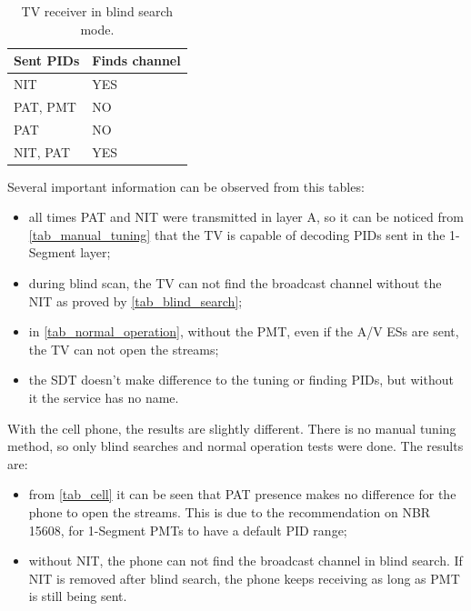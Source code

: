 \documentclass[
	12pt,				%
	openright,			%
	twoside,			%
	a4paper,			%
	brazil,
	french,				%
	english
	]{abntex2}
\begin{document}
\begin{table}
    \caption {TV receiver in blind search mode.}
    \begin{center}
\begin{tabular}{|l|l|}
    \hline
    Sent PIDs & Finds channel \\ \hline
    NIT       & YES           \\ \hline
    PAT, PMT  & NO            \\ \hline
    PAT       & NO            \\ \hline
    NIT, PAT  & YES           \\ \hline
    \end{tabular}
	\label{tab_blind_search}
\end{center}
\end{table}

Several important information can be observed from this tables:
\begin{itemize}
\item all times PAT and NIT were transmitted in layer A, so it can be noticed from \autoref{tab_manual_tuning} that the TV is capable of decoding PIDs sent in the 1-Segment layer;
\item during blind scan, the TV can not find the broadcast channel without the NIT as proved by \autoref{tab_blind_search};
\item in \autoref{tab_normal_operation}, without the PMT, even if the A/V ESs are sent, the TV can not open the streams;
\item the SDT doesn't make difference to the tuning or finding PIDs, but without it the service has no name.
\end{itemize}


With the cell phone, the results are slightly different. There is no manual tuning method, so only blind searches and normal operation tests were done. The results are:

\begin{itemize}
\item from \autoref{tab_cell} it can be seen that PAT presence makes no difference for the phone to open the streams. This is due to the recommendation on NBR 15608, for 1-Segment PMTs to have a default PID range;
\item without NIT, the phone can not find the broadcast channel in blind search. If NIT is removed after blind search, the phone keeps receiving as long as PMT is still being sent.
\end{itemize}
\end{document}
